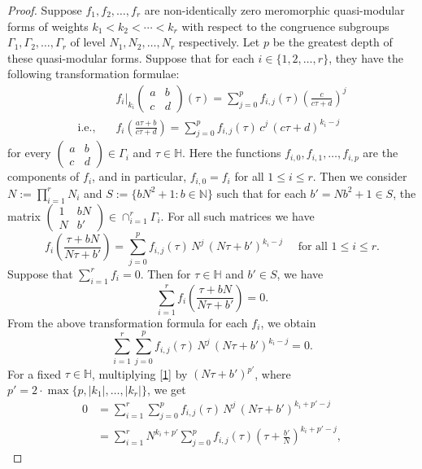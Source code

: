 \documentclass[11pt, reqno]{amsart}
\begin{document}
\begin{proof}
Suppose $f_1, f_2,\ldots,f_r$ are non-identically zero meromorphic quasi-modular forms of weights $k_1<k_2<\cdots<k_r$ with respect to the congruence subgroups $\Gamma_1,\Gamma_2,\ldots,\Gamma_r$ of level $N_1,N_2,\ldots,N_r$ respectively. Let $p$ be the greatest depth of these quasi-modular forms. Suppose that for each $i\in\{1,2,\ldots,r\}$, they have the following transformation formulae:
$$
\begin{aligned}
&f_i\big|_{k_i}\left(\begin{smallmatrix}
a & b\\
c & d
\end{smallmatrix}\right)(\tau)=\sum_{j=0}^p f_{i,j}(\tau)\left(\frac{c}{c\tau+d}\right)^j\\
\text{i.e.,}\quad & f_i\left(\frac{a\tau+b}{c\tau+d}\right)=\sum_{j=0}^p f_{i,j}(\tau)\,c^j\, (c\tau+d)^{k_i-j}
 \end{aligned}
$$
for every $\left(\begin{smallmatrix}
a & b\\
c & d
\end{smallmatrix}\right)\in \Gamma_i$ and $\tau\in\mathbb{H}$. Here the functions $f_{i,0},f_{i,1},\ldots, f_{i,p}$ are the components of $f_i$, and in particular, $f_{i,0}=f_i$ for all $1\leq i\leq r$. Then we consider $N:=\prod_{i=1}^r N_i$ and $S:=\{bN^2+1: b\in\mathbb{N}\}$ such that for each $b'=Nb^2+1\in S$, the matrix $\left(\begin{smallmatrix}
1 & bN\\
N & b'
\end{smallmatrix}\right)\in \cap_{i=1}^r\Gamma_i$. For all such matrices we have 
$$
f_i\left(\frac{\tau+bN}{N\tau+b'}\right)=\sum_{j=0}^p f_{i,j}(\tau)\,N^j\, \left(N\tau+b'\right)^{k_i-j} \quad \text{  for all } 1\leq i\leq r.
$$
Suppose that $\sum_{i=1}^r f_i=0$. Then for $\tau\in\mathbb{H}$ and $b'\in S$, we have 
$$
\sum_{i=1}^r f_i\left(\frac{\tau+bN}{N\tau+b'}\right)=0.
$$
 From the above transformation formula for each $f_i$, we obtain
\begin{equation}\label{1}
\sum_{i=1}^r\sum_{j=0}^p f_{i,j}(\tau)\, N^j\, (N\tau+b')^{k_i-j}=0.
 \end{equation}
For a fixed $\tau\in\mathbb{H}$, multiplying \eqref{1} by $(N\tau+b')^{p'}$, where $p'=2\cdot\max\{p,|k_1|,\ldots,|k_r|\} $,  we get $$
\begin{aligned}
0&=\sum_{i=1}^r\sum_{j=0}^p f_{i,j}(\tau)\, N^j\, (N\tau+b')^{k_i+p'-j}\\
&=\sum_{i=1}^r N^{k_i+p'}\sum_{j=0}^pf_{i,j}(\tau)\left(\tau+\frac{b'}{N}\right)^{k_i+p'-j},

\end{aligned}$$
\end{proof}
\end{document}
